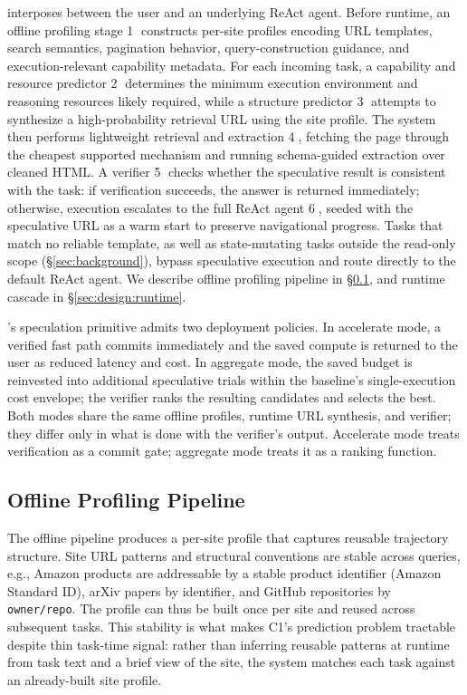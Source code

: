 \sys{} interposes between the user and an underlying ReAct agent. Before runtime, an offline profiling stage \textcircled{1} constructs per-site profiles encoding URL templates, search semantics, pagination behavior, query-construction guidance, and execution-relevant capability metadata. For each incoming task, a capability and resource predictor \textcircled{2} determines the minimum execution environment and reasoning resources likely required, while a structure predictor \textcircled{3} attempts to synthesize a high-probability retrieval URL using the site profile. The system then performs lightweight retrieval and extraction \textcircled{4}, fetching the page through the cheapest supported mechanism and running schema-guided extraction over cleaned HTML. A verifier \textcircled{5} checks whether the speculative result is consistent with the task: if verification succeeds, the answer is returned immediately; otherwise, execution escalates to the full ReAct agent \textcircled{6}, seeded with the speculative URL as a warm start to preserve navigational progress. Tasks that match no reliable template, as well as state-mutating tasks outside the read-only scope (\S\ref{sec:background}), bypass speculative execution and route directly to the default ReAct agent. We describe offline profiling pipeline in \S\ref{sec:design:offline}, and runtime cascade in \S\ref{sec:design:runtime}.

\sys's speculation primitive admits two deployment policies. In accelerate mode, a verified fast path commits immediately and the saved compute is returned to the user as reduced latency and cost. In aggregate mode, the saved budget is reinvested into additional speculative trials within the baseline's single-execution cost envelope; the verifier ranks the resulting candidates and selects the best. Both modes share the same offline profiles, runtime URL synthesis, and verifier; they differ only in what is done with the verifier's output. Accelerate mode treats verification as a commit gate; aggregate mode treats it as a ranking function. 

\subsection{Offline Profiling Pipeline}
\label{sec:design:offline}

The offline pipeline produces a per-site profile that captures
reusable trajectory structure. Site URL patterns and structural
conventions are stable across queries, e.g., Amazon products are
addressable by a stable product identifier (Amazon Standard
ID), arXiv papers by identifier,
and GitHub repositories by \texttt{owner/repo}. The profile can
thus be built once per site and reused across subsequent
tasks. This stability is what makes C1's prediction problem
tractable despite thin task-time signal: rather than inferring
reusable patterns at runtime from task text and a brief view of
the site, the system matches each task against an already-built
site profile.

